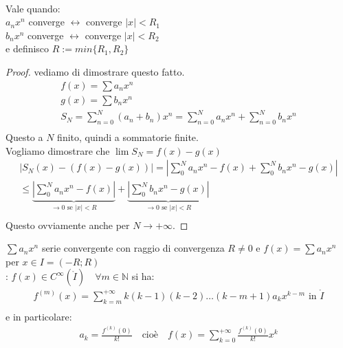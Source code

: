 \documentclass[a4paper, oneside]{article}
\begin{document}
\begin{solution}
  \hfil\\
  Vale quando:\\
  $a_n x^n $ converge $\leftrightarrow$ converge $|x|<R_1$\\
  $b_n x^n $ converge $\leftrightarrow$ converge $|x|<R_2$\\
  e definisco $R := min \{ R_1, R_2 \}$
\end{solution}

\begin{proof}
  vediamo di dimostrare questo fatto.\\
  \begin{gather*}
    f(x) = \sum a_n x^n \quad\\
    g(x) = \sum b_n x^n \\
    S_N = \sum_{n=0}^{N} (a_n + b_n) x^n = \sum_{n=0}^{N} a_n x^n + \sum_{n=0}^{N} b_n x^n \\
  \end{gather*}
  Questo a $N$ finito, quindi a sommatorie finite.\\
  Vogliamo dimostrare che $\lim S_N = f(x) - g(x)$
  \begin{gather*}
    \left\lvert S_N(x) - (f(x)- g(x)) \right\rvert = \left\lvert \sum_{0}^{N} a_n x^n - f(x) + \sum_{0}^{N} b_n x^n - g(x) \right\rvert \\
    \leq \underbrace{\left\lvert \sum_{0}^{N} a_n x^n - f(x) \right\rvert}_{\to 0 \text{ se } |x| < R} + \underbrace{\left\lvert \sum_{0}^{N} b_n x^n - g(x) \right\rvert}_{\to 0 \text{ se } |x| < R} \\
  \end{gather*}
  Questo ovviamente anche per $N \to +\infty$.
\end{proof}

\begin{theorem}
   $\sum a_n x^n$ serie convergente con raggio di convergenza $R\neq 0$ e  $f(x) = \sum a_n x^n$ per $x \in I = (-R;R)$\\
  : $f(x) \in C^\infty (\mathring{I}) \quad \forall m \in \mathbb{N}$ si ha:\\
  \begin{gather*}
    f^{(m)} (x) = \sum_{k=m}^{+\infty} k(k-1)(k-2) \dots (k - m + 1) a_k x^{k-m} \text{ in } \mathring{I}\\
  \end{gather*}
  e in particolare:
  \begin{gather*}
    a_k = \frac{f^{(k)}(0)}{k!} \quad \text{cioè} \quad f(x) = \sum_{k=0}^{+\infty} \frac{f^{(k)}(0)}{k!} x^k 
  \end{gather*}
\end{theorem}
\end{document}
